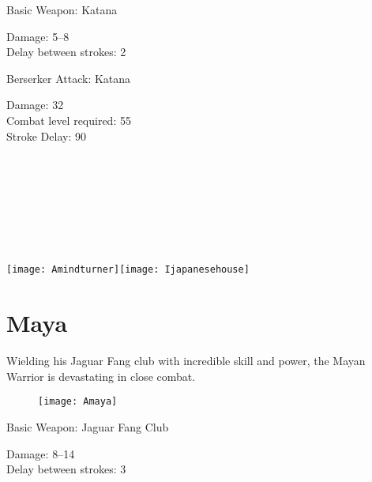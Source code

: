 Basic Weapon: Katana
\begin{adjustwidth}{1cm}{}
	Damage: 5–8 \\
	Delay between strokes: 2
\end{adjustwidth}
Berserker Attack: Katana
\begin{adjustwidth}{1cm}{}
	Damage: 32 \\
	Combat level required: 55 \\
	Stroke Delay: 90 \\ \\ \\ \\ \\ \\ \\ \\ 
\end{adjustwidth}

\begin{center}
	\texttt{[image: Amindturner]}\texttt{[image: Ijapanesehouse]}
\end{center}

\clearpage

\section{Maya}


Wielding his Jaguar Fang club with incredible skill and power, the Mayan Warrior is devastating in close combat.

\begin{wrapfigure}{r}{0.5\textwidth}
	\begin{center}
		\vspace{-20pt}
		\texttt{[image: Amaya]}
	\end{center}
	\vspace{-20pt}
\end{wrapfigure}

Basic Weapon: Jaguar Fang Club
\begin{adjustwidth}{1cm}{}
	Damage: 8–14 \\
	Delay between strokes: 3 \\ \\ \\ \\ \\ \\ \\ \\ 
\end{adjustwidth}

